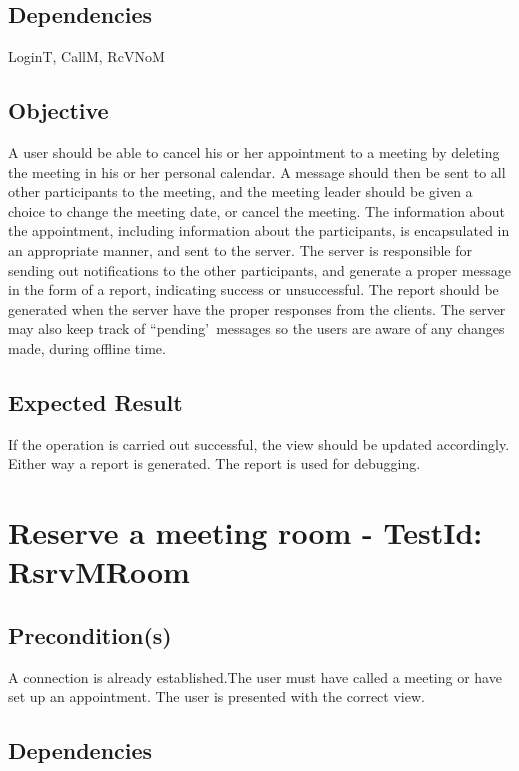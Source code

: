 \documentclass{article}
\begin{document}
\subsection{Dependencies}

LoginT, CallM, RcVNoM

\subsection{Objective}

A user should be able to cancel his or her appointment to a meeting by
deleting the meeting in his or her personal calendar. A message should then
be sent to all other participants to the meeting, and the meeting leader
should be given a choice to change the meeting date, or cancel the meeting.
The information about the appointment, including information about the
participants, is encapsulated in an appropriate manner, and sent to the
server. \bigskip The server is responsible for sending out notifications to
the other participants, and generate a proper message in the form of a
report, indicating success or unsuccessful. The report should be generated
when the server have the proper responses from the clients. The server may
also keep track of ``pending'\ messages so the users are aware of any
changes made, during offline time.

\subsection{Expected Result}

If the operation is carried out successful, the view should be updated
accordingly. Either way a report is generated. The report is used for
debugging. \newpage

\section{Reserve a meeting room - TestId: RsrvMRoom}

\subsection{Precondition(s)}

A connection is already established.The user must have called a meeting or
have set up an appointment. The user is presented with the correct view.

\subsection{Dependencies}
\end{document}
